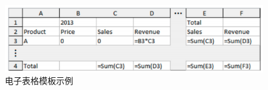 \begin{figure}[tp]    
    \centering
    \includegraphics[width=1\textwidth]{figure/template.png}
    \caption{电子表格模板示例}
    \label{figure-template}
\end{figure}